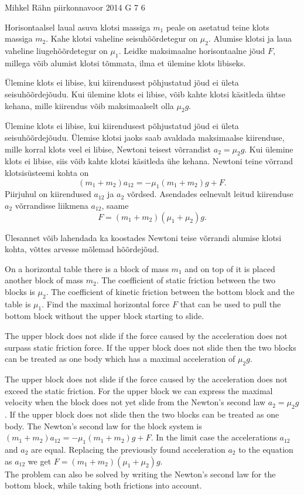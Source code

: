 {Mihkel Rähn} %
{piirkonnavoor} %
{2014} %
{G 7} %
{6} %
{
\ifStatement
Horisontaalsel laual asuva klotsi massiga $m_1$ peale on asetatud teine klots massiga $m_2$. Kahe klotsi vaheline seisuhõõrdetegur on $\mu_2$. Alumise klotsi ja laua vaheline liugehõõrdetegur on $\mu_1$. Leidke maksimaalne horisontaalne jõud $F$, millega võib alumist klotsi tõmmata, ilma et ülemine klots libiseks.
\fi


\ifHint
Ülemine klots ei libise, kui kiirendusest põhjustatud jõud ei ületa seisuhõõrdejõudu. Kui ülemine klots ei libise, võib kahte klotsi käsitleda ühtse kehana, mille kiirendus võib maksimaalselt olla $\mu_2g$.
\fi


\ifSolution
Ülemine klots ei libise, kui kiirendusest põhjustatud jõud ei ületa seisuhõõrdejõudu. Ülemise klotsi jaoks saab avaldada maksimaalse kiirenduse, mille korral klots veel ei libise, Newtoni teisest võrrandist $a_2=\mu_2g$. Kui ülemine klots ei libise, siis võib kahte klotsi käsitleda ühe kehana. Newtoni teine võrrand klotsisüsteemi kohta on 
\[
(m_1+m_2)a_{12} = -\mu_1 (m_1+m_2)g+F.
\]
Piirjuhul on kiirendused $a_{12}$ ja $a_2$ võrdsed. Asendades eelnevalt leitud kiirenduse $a_2$ võrrandisse liikmena $a_{12}$, saame
\[
F=(m_1+m_2)(\mu_1+\mu_2)g.
\]


Ülesannet võib lahendada ka koostades Newtoni teise võrrandi alumise klotsi kohta, võttes arvesse mõlemad hõõrdejõud. 
\fi


\ifEngStatement
On a horizontal table there is a block of mass $m_1$ and on top of it is placed another block of mass $m_2$. The coefficient of static friction between the two blocks is $\mu_2$. The coefficient of kinetic friction between the bottom block and the table is $\mu_1$. Find the maximal horizontal force $F$ that can be used to pull the bottom block without the upper block starting to slide.
\fi


\ifEngHint
The upper block does not slide if the force caused by the acceleration does not surpass static friction force. If the upper block does not slide then the two blocks can be treated as one body which has a maximal acceleration of $\mu_2g$.
\fi


\ifEngSolution
The upper block does not slide if the force caused by the acceleration does not exceed the static friction. For the upper block we can express the maximal velocity when the block does not yet slide from the Newton’s second law $a_2=\mu_2g$. If the upper block does not slide then the two blocks can be treated as one body. The Newton’s second law for the block system is $(m_1+m_2)a_{12} = -\mu_1 (m_1+m_2)g+F$. In the limit case the accelerations $a_{12}$ and $a_2$ are equal. Replacing the previously found acceleration $a_2$ to the equation as $a_{12}$ we get $F=(m_1+m_2)(\mu_1+\mu_2)g$.\\
The problem can also be solved by writing the Newton’s second law for the bottom block, while taking both frictions into account.
\fi
}